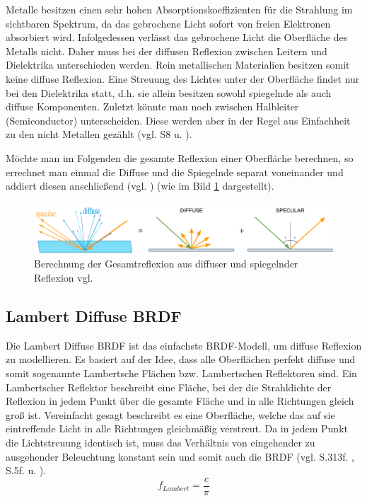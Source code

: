 \documentclass[
  11pt,
  a4paper,
  oneside
  ]{article}
\begin{document}
Metalle besitzen einen sehr hohen Absorptionskoeffizienten für die Strahlung im sichtbaren Spektrum, da das gebrochene Licht sofort von freien Elektronen absorbiert wird. Infolgedessen verlässt das gebrochene Licht die Oberfläche des Metalls nicht. Daher muss bei der diffusen Reflexion zwischen Leitern und Dielektrika unterschieden werden. Rein metallischen Materialien besitzen somit keine diffuse Reflexion. Eine Streuung des Lichtes unter der Oberfläche findet nur bei den Dielektrika statt, d.h. sie allein besitzen sowohl spiegelnde als auch diffuse Komponenten. Zuletzt könnte man noch zwischen Halbleiter (Semiconductor) unterscheiden. Diese werden aber in der Regel aus Einfachheit zu den nicht Metallen gezählt 
(vgl. S8 \cite{rtrPaper} u. \cite{pbrGuide,learnOpenGL,googleFilamentPbr}).

Möchte man im Folgenden die gesamte Reflexion einer Oberfläche berechnen, so errechnet man einmal die Diffuse und die Spiegelnde separat voneinander und addiert diesen anschließend (vgl. \cite{learnOpenGL}) (wie im Bild \ref{fig:img1} dargestellt).
\begin{figure}[H]
  \centering
  \includegraphics*[width=1 \textwidth]{images/brdf.PNG}
  \caption{Berechnung der Gesamtreflexion aus diffuser und spiegelnder Reflexion vgl. \cite{learnOpenGL}}
  \label{fig:img1}
\end{figure}

\subsection{Lambert Diffuse BRDF}
Die Lambert Diffuse BRDF ist das einfachste BRDF-Modell, um diffuse Reflexion zu modellieren. Es basiert auf der Idee, dass alle Oberflächen perfekt diffuse und somit sogenannte Lambertsche Flächen bzw. Lambertschen Reflektoren sind. Ein Lambertscher Reflektor beschreibt eine Fläche, bei der die Strahldichte der Reflexion in jedem Punkt über die gesamte Fläche und in alle Richtungen gleich groß ist. Vereinfacht gesagt beschreibt es eine Oberfläche, welche das auf sie eintreffende Licht in alle Richtungen gleichmäßig verstreut. Da in jedem Punkt die Lichtstreuung identisch ist, muss das Verhältnis von eingehender zu ausgehender Beleuchtung konstant sein und somit auch die BRDF 
(vgl. S.313f. \cite{realTimeRendering4th}, S.5f. \cite{irrlichtOrg} u. \cite{learnOpenGL}). 
\begin{equation}
  f_{Lambert}=\dfrac{c}{\pi}
\end{equation}
\end{document}
